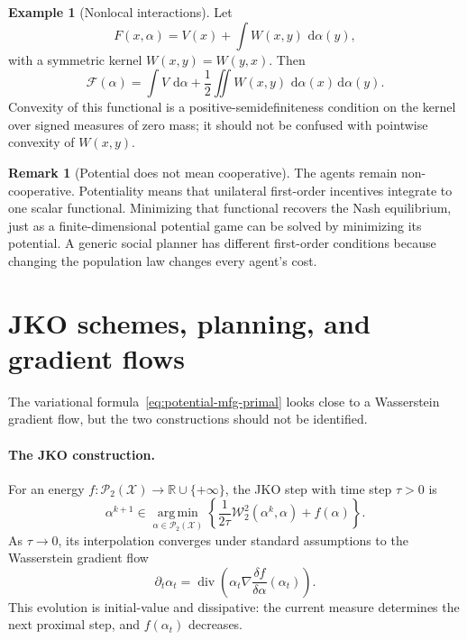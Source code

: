 \documentclass[11pt,a4paper]{article}
\theoremstyle{definition}
\newtheorem{example}[theorem]{Example}
\newtheorem{remark}[theorem]{Remark}
\newcommand{\RR}{\mathbb R}
\newcommand{\Ptwo}{\mathcal P_2}
\newcommand{\Wass}{\mathcal W}
\newcommand{\argmin}{\operatorname*{arg\,min}}
\newcommand{\diverg}{\operatorname{div}}
\newcommand{\dd}{\,\mathrm d}
\newcommand{\al}{\alpha}
\begin{document}
\begin{example}[Nonlocal interactions]
Let
\[
  F(x,\al)=V(x)+\int W(x,y)\,\dd\al(y),
\]
with a symmetric kernel $W(x,y)=W(y,x)$.  Then
\[
  \mathcal F(\al)=\int V\,\dd\al
  +\frac12\iint W(x,y)\,\dd\al(x)\dd\al(y).
\]
Convexity of this functional is a positive-semidefiniteness condition on the
kernel over signed measures of zero mass; it should not be confused with
pointwise convexity of $W(x,y)$.
\end{example}

\begin{remark}[Potential does not mean cooperative]
The agents remain non-cooperative.  Potentiality means that unilateral
first-order incentives integrate to one scalar functional.  Minimizing that
functional recovers the Nash equilibrium, just as a finite-dimensional
potential game can be solved by minimizing its potential.  A generic social
planner has different first-order conditions because changing the population
law changes every agent's cost.
\end{remark}

\section{JKO schemes, planning, and gradient flows}

The variational formula~\eqref{eq:potential-mfg-primal} looks close to a
Wasserstein gradient flow, but the two constructions should not be identified.

\paragraph{The JKO construction.}
For an energy $f:\Ptwo(\mathcal X)\to\RR\cup\{+\infty\}$, the JKO step with
time step $\tau>0$ is
\begin{equation}\label{eq:mfg-jko}
  \al^{k+1}\in\argmin_{\al\in\Ptwo(\mathcal X)}
  \left\{
    \frac1{2\tau}\Wass_2^2(\al^k,\al)+f(\al)
  \right\}.
\end{equation}
As $\tau\to0$, its interpolation converges under standard assumptions to
the Wasserstein gradient flow
\begin{equation}\label{eq:mfg-wgf}
  \partial_t\al_t
  =\diverg\!\left(
    \al_t\nabla\frac{\delta f}{\delta\al}(\al_t)
  \right).
\end{equation}
This evolution is initial-value and dissipative: the current measure
determines the next proximal step, and $f(\al_t)$ decreases.
\end{document}
